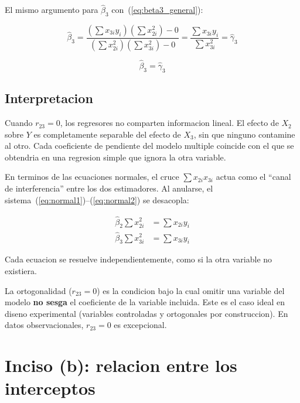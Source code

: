 \documentclass[12pt, letterpaper]{article}
\theoremstyle{remark}
\begin{document}
El mismo argumento para $\hat\beta_3$ con~(\ref{eq:beta3_general}):

\begin{equation}
  \hat\beta_3
    = \frac{(\sum x_{3i} y_i)(\sum x_{2i}^2) - 0}
           {(\sum x_{2i}^2)(\sum x_{3i}^2) - 0}
    = \frac{\sum x_{3i} y_i}{\sum x_{3i}^2}
    = \hat\gamma_3
  \label{eq:beta3_ortogonal}
\end{equation}

\begin{equation}
  \boxed{\hat\beta_3 = \hat\gamma_3}
  \label{eq:igual_beta3}
\end{equation}

\subsection{Interpretacion}

Cuando $r_{23} = 0$, los regresores no comparten informacion lineal. El efecto
de $X_2$ sobre $Y$ es completamente separable del efecto de $X_3$, sin que
ninguno contamine al otro. Cada coeficiente de pendiente del modelo multiple
coincide con el que se obtendria en una regresion simple que ignora la otra
variable.

En terminos de las ecuaciones normales, el cruce $\sum x_{2i}x_{3i}$ actua
como el ``canal de interferencia'' entre los dos estimadores. Al anularse,
el sistema~(\ref{eq:normal1})--(\ref{eq:normal2}) se desacopla:

\begin{align}
  \hat\beta_2 \sum x_{2i}^2 &= \sum x_{2i} y_i
  \label{eq:desacoplado1}\\
  \hat\beta_3 \sum x_{3i}^2 &= \sum x_{3i} y_i
  \label{eq:desacoplado2}
\end{align}

Cada ecuacion se resuelve independientemente, como si la otra variable no
existiera.

\begin{clave}
  La ortogonalidad ($r_{23} = 0$) es la condicion bajo la cual omitir una
  variable del modelo \textbf{no sesga} el coeficiente de la variable
  incluida. Este es el caso ideal en diseno experimental (variables
  controladas y ortogonales por construccion). En datos observacionales,
  $r_{23} = 0$ es excepcional.
\end{clave}

\section{Inciso (b): relacion entre los interceptos}
\end{document}
